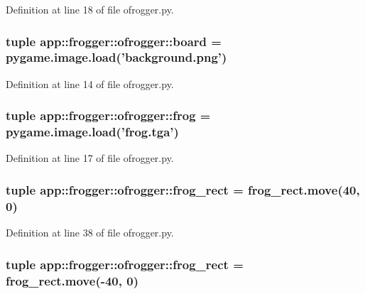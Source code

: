 Definition at line 18 of file ofrogger.py.
\subsubsection{\setlength{\rightskip}{0pt plus 5cm}tuple {\bf app::frogger::ofrogger::board} = pygame.image.load('background.png')\hspace{0.3cm}{\tt  [static]}}\label{namespaceapp_1_1frogger_1_1ofrogger_a265ea47237defd0d19dc8de5a6c2dad}




Definition at line 14 of file ofrogger.py.
\subsubsection{\setlength{\rightskip}{0pt plus 5cm}tuple {\bf app::frogger::ofrogger::frog} = pygame.image.load('frog.tga')\hspace{0.3cm}{\tt  [static]}}\label{namespaceapp_1_1frogger_1_1ofrogger_a10bed2f92f8802f72f3dc11db966d0e}




Definition at line 17 of file ofrogger.py.
\subsubsection{\setlength{\rightskip}{0pt plus 5cm}tuple {\bf app::frogger::ofrogger::frog\_\-rect} = frog\_\-rect.move(40, 0)\hspace{0.3cm}{\tt  [static]}}\label{namespaceapp_1_1frogger_1_1ofrogger_73e5778df82d9e2af308f935cd456551}




Definition at line 38 of file ofrogger.py.
\subsubsection{\setlength{\rightskip}{0pt plus 5cm}tuple {\bf app::frogger::ofrogger::frog\_\-rect} = frog\_\-rect.move(-40, 0)\hspace{0.3cm}{\tt  [static]}}\label{namespaceapp_1_1frogger_1_1ofrogger_73e5778df82d9e2af308f935cd456551}




